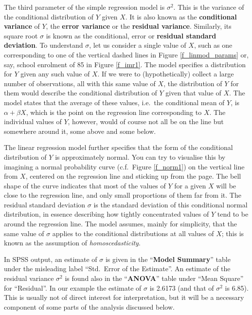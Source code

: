 The third parameter of the simple regression model is $\sigma^{2}$. This
is the variance of the conditional distribution of $Y$ given $X$. It is
also known as the \textbf{conditional variance} of $Y$, the
\textbf{error variance} or the \textbf{residual variance}. Similarly,
its square root $\sigma$ is known as the conditional, error or
\textbf{residual standard deviation}. To understand $\sigma$, let us
consider a single value of $X$, such as one corresponding to one of the
vertical dashed lines in Figure \ref{f_linmod_params} or, say, school
enrolment of 85 in Figure \ref{f_imr1}. The model specifies a
distribution for $Y$ given any such value of $X$. If we were to
(hypothetically) collect a large number of observations, all with this
same value of $X$, the distribution of $Y$ for them would describe the
conditional distribution of $Y$ given that value of $X$. The model
states that the average of these values, i.e.\ the conditional mean of
$Y$, is $\alpha+\beta X$, which is the point on the regression line
corresponding to $X$. The individual values of $Y$, however, would of
course not all be on the line but somewhere around it, some above and
some below.

The linear regression model further specifies that the form of the
conditional distribution of $Y$ is approximately normal. You can try to
visualise this by imagining a normal probability curve (c.f.\ Figure
\ref{f_norm1}) on the vertical line from $X$, centered on the regression
line and sticking up from the page. The bell shape of the curve
indicates that most of the values of $Y$ for a given $X$ will be close
to the regression line, and only small proportions of them far from it.
The residual standard deviation $\sigma$ is the standard deviation of
this conditional normal distribution, in essence describing how tightly
concentrated values of $Y$ tend to be around the regression line. The
model assumes, mainly for simplicity, that the same value of
$\sigma$ applies to the conditional distributions at all values of $X$;
this is known as the assumption of \emph{homoscedasticity}.

In SPSS output, an estimate of $\sigma$ is given in the ``\textbf{Model
Summary}'' table under the misleading label ``Std.\ Error of the
Estimate''.
An estimate of the residual variance $\sigma^{2}$ is found also in the
``\textbf{ANOVA}'' table under ``Mean Square'' for ``Residual''. In our
example the estimate of $\sigma$ is 2.6173 (and that of $\sigma^{2}$ is
6.85). This is usually not of direct interest for interpretation,
but it will be a necessary component of some parts of the
analysis discussed below.


